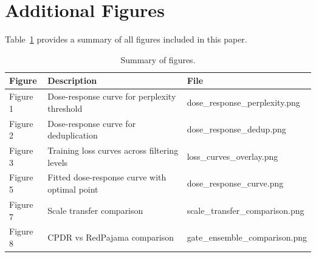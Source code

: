 \appendix
\section{Additional Figures}

Table~\ref{tab:figures_appendix} provides a summary of all figures included in this paper.

\begin{table}[h]
\centering
\caption{Summary of figures.}
\label{tab:figures_appendix}
\begin{tabular}{@{}lll@{}}
\toprule
Figure & Description & File \\
\midrule
Figure 1 & Dose-response curve for perplexity threshold & dose\_response\_perplexity.png \\
Figure 2 & Dose-response curve for deduplication & dose\_response\_dedup.png \\
Figure 3 & Training loss curves across filtering levels & loss\_curves\_overlay.png \\
Figure 5 & Fitted dose-response curve with optimal point & dose\_response\_curve.png \\
Figure 7 & Scale transfer comparison & scale\_transfer\_comparison.png \\
Figure 8 & CPDR vs RedPajama comparison & gate\_ensemble\_comparison.png \\
\bottomrule
\end{tabular}
\end{table}
